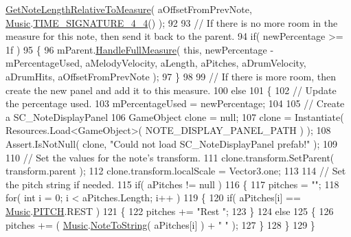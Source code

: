 \begin{DoxyCodeInclude}
      \hyperlink{group___music_stat_func_ga91e290b48ad2289493ba4421308abe49}{GetNoteLengthRelativeToMeasure}( aOffsetFromPrevNote, 
      \hyperlink{class_music}{Music}.\hyperlink{group___music_stat_func_gac95af323eef7511543c799154e1c29fd}{TIME\_SIGNATURE\_4\_4}() );
92 
93         \textcolor{comment}{// If there is no more room in the measure for this note, then send it back to the parent.}
94         \textcolor{keywordflow}{if}( newPercentage >= 1f )
95         \{
96             mParent.\hyperlink{group___s_c___n_d_c_handlers_ga40c5a3b59608c559ab96ad0338c5e042}{HandleFullMeasure}( \textcolor{keyword}{this}, newPercentage - mPercentageUsed, 
      aMelodyVelocity, aLength, aPitches, aDrumVelocity, aDrumHits, aOffsetFromPrevNote );
97         \}
98 
99         \textcolor{comment}{// If there is more room, then create the new panel and add it to this measure.}
100         \textcolor{keywordflow}{else}
101         \{
102             \textcolor{comment}{// Update the percentage used.}
103             mPercentageUsed = newPercentage;
104 
105             \textcolor{comment}{// Create a SC\_NoteDisplayPanel}
106             GameObject clone = null;
107             clone = Instantiate( Resources.Load<GameObject>( NOTE\_DISPLAY\_PANEL\_PATH ) );
108             Assert.IsNotNull( clone, \textcolor{stringliteral}{"Could not load SC\_NoteDisplayPanel prefab!"} );
109 
110             \textcolor{comment}{// Set the values for the note's transform.}
111             clone.transform.SetParent( transform.parent );
112             clone.transform.localScale = Vector3.one;
113 
114             \textcolor{comment}{// Set the pitch string if needed.}
115             \textcolor{keywordflow}{if}( aPitches != null )
116             \{
117                 pitches = \textcolor{stringliteral}{""};
118                 \textcolor{keywordflow}{for}( \textcolor{keywordtype}{int} i = 0; i < aPitches.Length; i++ )
119                 \{
120                     \textcolor{keywordflow}{if}( aPitches[i] == \hyperlink{class_music}{Music}.\hyperlink{group___music_enums_ga508f69b199ea518f935486c990edac1d}{PITCH}.REST )
121                     \{
122                         pitches += \textcolor{stringliteral}{"Rest "};
123                     \}
124                     \textcolor{keywordflow}{else}
125                     \{
126                         pitches += ( \hyperlink{class_music}{Music}.\hyperlink{group___music_stat_func_ga85a22c905d56d4c5f4e62159bfecee8c}{NoteToString}( aPitches[i] ) + \textcolor{stringliteral}{" "} );
127                     \}
128                 \}
129             \}

\end{DoxyCodeInclude}
